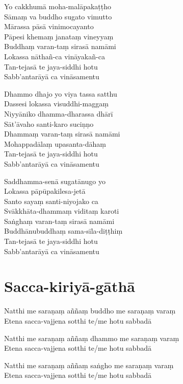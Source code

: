 \begin{paritta}
Yo cakkhumā moha-malāpakaṭṭho\\
Sāmaṃ va buddho sugato vimutto\\
Mārassa pāsā vinimocayanto\\
Pāpesi khemaṃ janataṃ vineyyaṃ\\
Buddhaṃ varan-taṃ sirasā namāmi\\
Lokassa nāthañ-ca vināyakañ-ca\\
Tan-tejasā te jaya-siddhi hotu\\
Sabb'antarāyā ca vināsamentu

Dhammo dhajo yo viya tassa satthu\\
Dassesi lokassa visuddhi-maggaṃ\\
Niyyāniko dhamma-dharassa dhārī\\
Sāt'āvaho santi-karo suciṇṇo\\
Dhammaṃ varan-taṃ sirasā namāmi\\
Mohappadālaṃ upasanta-dāhaṃ\\
Tan-tejasā te jaya-siddhi hotu\\
Sabb'antarāyā ca vināsamentu

Saddhamma-senā sugatānugo yo\\
Lokassa pāpūpakilesa-jetā\\
Santo sayaṃ santi-niyojako ca\\
Svākkhāta-dhammaṃ viditaṃ karoti\\
Saṅghaṃ varan-taṃ sirasā namāmi\\
Buddhānubuddhaṃ sama-sīla-diṭṭhiṃ\\
Tan-tejasā te jaya-siddhi hotu\\
Sabb'antarāyā ca vināsamentu 
\end{paritta}

\section{Sacca-kiriyā-gāthā}

Natthi me saraṇaṃ aññaṃ buddho me saraṇaṃ varaṃ\\
Etena sacca-vajjena sotthi te/me hotu sabbadā

Natthi me saraṇaṃ aññaṃ dhammo me saraṇaṃ varaṃ\\
Etena sacca-vajjena sotthi te/me hotu sabbadā

Natthi me saraṇaṃ aññaṃ saṅgho me saraṇaṃ varaṃ\\
Etena sacca-vajjena sotthi te/me hotu sabbadā

